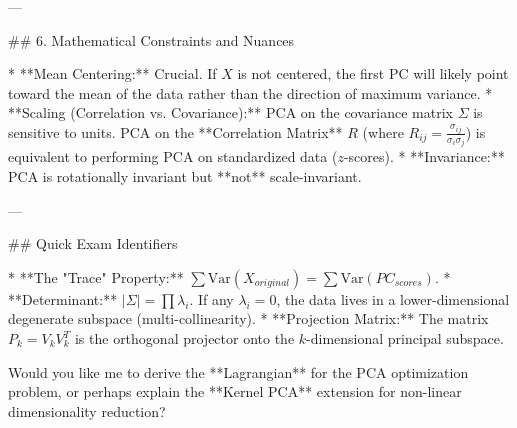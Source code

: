---

## 6. Mathematical Constraints and Nuances

* **Mean Centering:** Crucial. If $X$ is not centered, the first PC will likely point toward the mean of the data rather than the direction of maximum variance.
* **Scaling (Correlation vs. Covariance):** PCA on the covariance matrix $\Sigma$ is sensitive to units. PCA on the **Correlation Matrix** $R$ (where $R_{ij} = \frac{\sigma_{ij}}{\sigma_i \sigma_j}$) is equivalent to performing PCA on standardized data ($z$-scores).
* **Invariance:** PCA is rotationally invariant but **not** scale-invariant.

---

## Quick Exam Identifiers

* **The "Trace" Property:** $\sum \text{Var}(X_{original}) = \sum \text{Var}(PC_{scores})$.
* **Determinant:** $|\Sigma| = \prod \lambda_i$. If any $\lambda_i = 0$, the data lives in a lower-dimensional degenerate subspace (multi-collinearity).
* **Projection Matrix:** The matrix $P_k = V_k V_k^T$ is the orthogonal projector onto the $k$-dimensional principal subspace.

Would you like me to derive the **Lagrangian** for the PCA optimization problem, or perhaps explain the **Kernel PCA** extension for non-linear dimensionality reduction?

